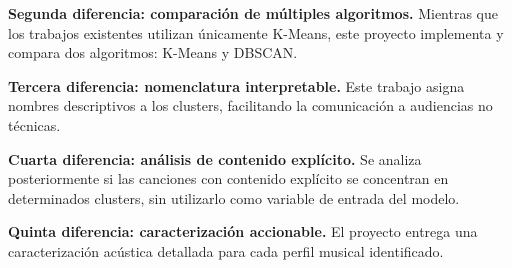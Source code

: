 \textbf{Segunda diferencia: comparación de múltiples algoritmos.} Mientras que los trabajos existentes utilizan únicamente K-Means, este proyecto implementa y compara dos algoritmos: K-Means y DBSCAN.

\textbf{Tercera diferencia: nomenclatura interpretable.} Este trabajo asigna nombres descriptivos a los clusters, facilitando la comunicación a audiencias no técnicas.

\textbf{Cuarta diferencia: análisis de contenido explícito.} Se analiza posteriormente si las canciones con contenido explícito se concentran en determinados clusters, sin utilizarlo como variable de entrada del modelo.

\textbf{Quinta diferencia: caracterización accionable.} El proyecto entrega una caracterización acústica detallada para cada perfil musical identificado.